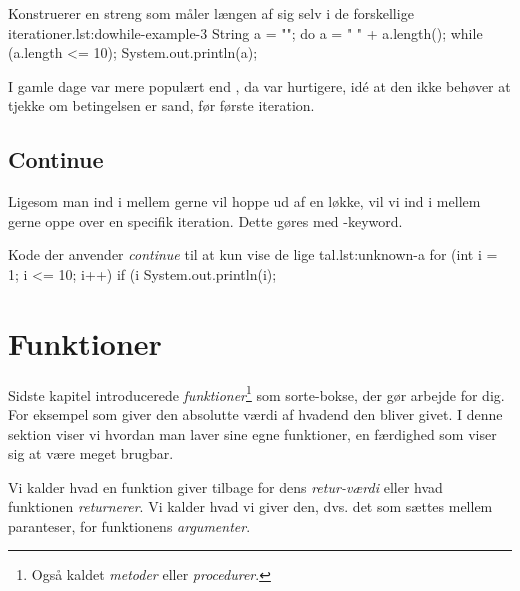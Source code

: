 		\begin{JavaCode}{Konstruerer en streng som måler længen af sig selv i de forskellige iterationer.}{lst:dowhile-example-3}
			String a = "";
			do {
				a = " " + a.length();
			} while (a.length <= 10);
			System.out.println(a);
		\end{JavaCode}

        I gamle dage var  mere populært end
        , da  var
        hurtigere, idé at den ikke behøver at tjekke om betingelsen er
        sand, før første iteration.

	\subsection{Continue}

        Ligesom man ind i mellem gerne vil hoppe ud af en løkke, vil
        vi ind i mellem gerne oppe over en specifik iteration. Dette gøres med -keyword.

		\begin{JavaCode}{Kode der anvender \emph{continue} til at kun vise de lige tal.}{lst:unknown-a}
			for (int i = 1; i <= 10; i++) {
				if (i %
				System.out.println(i);
			}
		\end{JavaCode}


\section{Funktioner}

	Sidste kapitel introducerede \emph{funktioner}\footnote{Også kaldet \emph{metoder} eller \emph{procedurer}.}
	som sorte-bokse, der gør arbejde for dig. For eksempel 
	som giver den absolutte værdi af hvadend den bliver givet. I denne sektion
	viser vi hvordan man laver sine egne funktioner, en færdighed som viser
	sig at være meget brugbar.

    Vi kalder hvad en funktion giver tilbage for dens
    \emph{retur-værdi} eller hvad funktionen \emph{returnerer}. Vi
    kalder hvad vi giver den, dvs. det som sættes mellem paranteser,
    for funktionens \emph{argumenter}.


